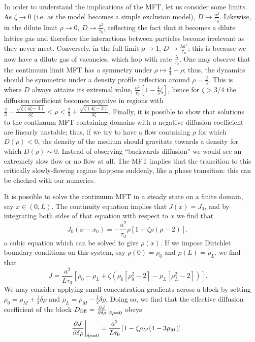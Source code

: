 In order to understand the implications of the MFT, let us consider some limits. As $\zeta \rightarrow 0$ (i.e. as the model becomes a simple exclusion model), $D \rightarrow \frac{a^2}{\tau_0}$. Likewise, in the
dilute limit $\rho \rightarrow 0$, $D \rightarrow \frac{ a^2}{\tau_0}$, reflecting the fact that it becomes a dilute lattice gas and therefore the interactions between particles become irrelevant as they never meet.
Conversely, in the full limit $\rho \rightarrow 1$, $D \rightarrow \frac{\lambda a^2}{\tau_0}$; this is because we now have a dilute gas of vacancies, which hop with rate $\frac{\lambda}{\tau_0}$.
One may observe that the continuum limit MFT has a symmetry under $\rho \mapsto \frac{4}{3} - \rho$; thus, the dynamics should be symmetric under a density profile reflection around $\rho = \frac{2}{3}$. This is where $D$ always
attains its extremal value, $ \frac{a^2}{\tau_0}\left[1 - \frac{4}{3}\zeta\right]$, hence for $\zeta>3/4$ the diffusion coefficient becomes negative in regions with
$\frac{2}{3} - \frac{\sqrt{\zeta\left(4\zeta - 3\right)}}{3\zeta} < \rho < \frac{2}{3} + \frac{\sqrt{\zeta\left(4\zeta - 3\right)}}{3\zeta}$.
Finally, it is possible to show that solutions to the continuum MFT containing domains with a negative diffusion coefficient are linearly unstable; thus, if we try to have a flow containing $\rho$ for which $D(\rho)<0$,
the density of the medium should gravitate towards a density for which $D(\rho)\sim 0$. Instead of observing ``backwards diffusion'' we would see an extremely slow flow or no flow at all. The MFT implies that the transition
to this critically slowly-flowing regime happens suddenly, like a phase transition: this can be checked with our numerics.

It is possible to solve the continuum MFT in a steady state on a finite domain, say $x\in(0, L)$. The continuity equation implies that $J(x)=J_0$, and by integrating both sides of that equation with respect to $x$ we find that
\begin{equation}
 J_0 (x-x_0) = -\frac{a^2}{\tau_0} \rho \left[1+\zeta \rho\left(\rho-2\right)\right],
\end{equation}
a cubic equation which can be solved to give $\rho(x)$. If we impose Dirichlet boundary conditions on this system, say $\rho(0)=\rho_0$ and $\rho(L)=\rho_L$, we find that
\begin{equation}
 J = \frac{a^2}{L \tau_0} \left[ \rho_0 - \rho_L + \zeta \left( \rho_0\left[\rho_0^2-2\right] - \rho_L\left[\rho_L^2-2\right] \right) \right].
\end{equation}
We may consider applying small concentration gradients across a block by setting $\rho_0 = \rho_M + \frac{1}{2}\delta\rho$ and $\rho_L = \rho_M - \frac{1}{2}\delta\rho$. Doing so, we find that the effective diffusion coefficient of the block
$D_\mathrm{Eff}=\frac{\partial J}{\partial \delta\rho}\big|_{\delta\rho=0}$ obeys
\begin{equation}
\label{eq:MFTflow}
 \frac{\partial J}{\partial \delta\rho}\bigg|_{\delta\rho=0} = \frac{a^2}{L \tau_0} \left[ 1 - \zeta\rho_M(4-3\rho_M) \right].
\end{equation}